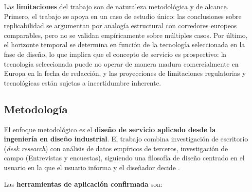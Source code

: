 Las \textbf{limitaciones} del trabajo son de naturaleza metodológica y de
alcance. Primero, el trabajo se apoya en un caso de estudio único: las
conclusiones sobre replicabilidad se argumentan por analogía estructural
con corredores europeos comparables, pero no se validan empíricamente sobre
múltiples casos. Por último, el horizonte temporal se determina en función de la tecnología seleccionada en la fase de diseño, lo que implica que el concepto de servicio es prospectivo: la tecnología seleccionada puede no operar de manera madura comercialmente en Europa en la fecha de redacción, y las proyecciones de limitaciones regulatorias y tecnológicas están sujetas a incertidumbre inherente.



\subsection{Metodología}
\label{sec:metodologia}

El enfoque metodológico es el \textbf{diseño de servicio aplicado desde la
ingeniería en diseño industrial}. El trabajo combina investigación de
escritorio (\textit{desk research}) con análisis de datos empíricos de
terceros, investigación de campo (Entrevistas y encuestas), siguiendo una filosofía de diseño centrado en el usuario en la
que el usuario informa y el diseñador decide \parencite{MartinezRodriguez2024}.

Las \textbf{herramientas de aplicación confirmada} son:

